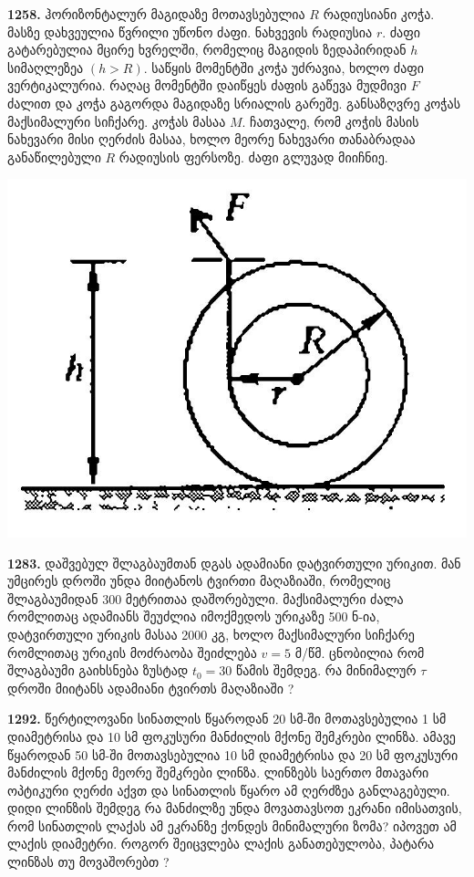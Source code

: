 \documentclass[12pt,a4paper,]{report}
\begin{document}
\textbf{1258.} ჰორიზონტალურ მაგიდაზე მოთავსებულია $R$ რადიუსიანი კოჭა. მასზე დახვეულია წვრილი უწონო ძაფი. ნახვევის რადიუსია $r$. ძაფი გატარებულია მცირე ხვრელში, რომელიც მაგიდის ზედაპირიდან $h$ სიმაღლეზეა $(h>R)$. საწყის მომენტში კოჭა უძრავია, ხოლო ძაფი ვერტიკალურია. რაღაც მომენტში დაიწყეს ძაფის გაწევა მუდმივი $F$ ძალით და კოჭა გაგორდა მაგიდაზე სრიალის გარეშე. განსაზღვრე კოჭას მაქსიმალური სიჩქარე. კოჭას მასაა $M$. ჩათვალე, რომ კოჭის მასის ნახევარი მისი ღერძის მასაა, ხოლო მეორე ნახევარი თანაბრადაა განაწილებული $R$ რადიუსის ფერსოზე. ძაფი გლუვად მიიჩნიე.
		\begin{center}
			\includegraphics[scale=0.2]{images/F1258.jpg}
		\end{center}

\textbf{1283.} დაშვებულ შლაგბაუმთან დგას ადამიანი დატვირთული ურიკით. მან უმცირეს დროში უნდა მიიტანოს ტვირთი მაღაზიაში, რომელიც შლაგბაუმიდან 300 მეტრითაა დაშორებული. მაქსიმალური ძალა რომლითაც ადამიანს შეუძლია იმოქმედოს ურიკაზე 500 ნ-ია, დატვირთული ურიკის მასაა 2000 კგ, ხოლო მაქსიმალური სიჩქარე რომლითაც ურიკის მოძრაობა შეიძლება $v=5$ მ/წმ. ცნობილია რომ შლაგბაუმი გაიხსნება ზუსტად $t_0=30$ წამის შემდეგ. რა მინიმალურ $\tau$ დროში მიიტანს ადამიანი ტვირთს მაღაზიაში ? 

\textbf{1292.} წერტილოვანი სინათლის წყაროდან 20 სმ-ში მოთავსებულია 1 სმ დიამეტრისა და 10 სმ ფოკუსური მანძილის მქონე შემკრები ლინზა. ამავე წყაროდან 50 სმ-ში მოთავსებულია 10 სმ დიამეტრისა და 20 სმ ფოკუსური მანძილის მქონე მეორე შემკრები ლინზა. ლინზებს საერთო მთავარი ოპტიკური ღერძი აქვთ და სინათლის წყარო ამ ღერძზეა განლაგებული. დიდი ლინზის შემდეგ რა მანძილზე უნდა მოვათავსოთ ეკრანი იმისათვის, რომ სინათლის ლაქას ამ ეკრანზე ქონდეს მინიმალური ზომა? იპოვეთ ამ ლაქის დიამეტრი. როგორ შეიცვლება ლაქის განათებულობა, პატარა ლინზას თუ მოვაშორებთ ?
\end{document}
